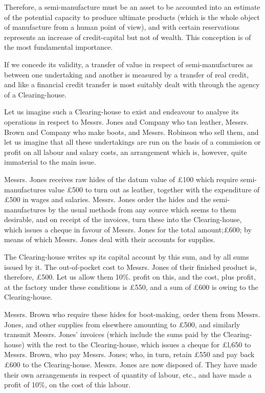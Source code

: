 \documentclass{book}
\begin{document}
Therefore, a semi-manufacture must be an asset to be accounted into an estimate of the potential capacity to produce ultimate products (which is the whole object of manufacture from a human point of view), and with certain reservations represents an increase of credit-capital but not of wealth. This conception is of the most fundamental importance.

If we concede its validity, a transfer of value in respect of semi-manufactures as between one undertaking and another is measured by a transfer of real credit, and like a financial credit transfer is most suitably dealt with through the agency of a Clearing-house.

Let us imagine such a Clearing-house to exist and endeavour to analyse its operations in respect to Messrs. Jones and Company who tan leather, Messrs. Brown and Company who make boots, and Messrs. Robinson who sell them, and let us imagine that all these undertakings are run on the basis of a commission or profit on all labour and salary costs, an arrangement which is, however, quite immaterial to the main issue.

Messrs. Jones receives raw hides of the datum value of £100 which require semi-manufactures value £500 to turn out as leather, together with the expenditure of £500 in wages and salaries. Messrs. Jones order the hides and the semi-manufactures by the usual methods from any source which seems to them desirable, and on receipt of the invoices, turn these into the Clearing-house, which issues a cheque in favour of Messrs. Jones for the total amount;£600; by means of which Messrs. Jones deal with their accounts for supplies.

The Clearing-house writes \emph{up} its capital account by this sum, and by all sums issued by it. The out-of-pocket cost to Messrs. Jones of their finished product is, therefore, £500. Let us allow them 10\%. profit on this, and the cost, plus profit, at the factory under these conditions is £550, and a sum of £600 is owing to the Clearing-house.

Messrs. Brown who require these hides for boot-making, order them from Messrs. Jones, and other supplies from elsewhere amounting to £500, and similarly transmit Messrs. Jones’ invoices (which include the sums paid by the Clearing-house) with the rest to the Clearing-house, which issues a cheque for £l,650 to Messrs. Brown, who pay Messrs. Jones; who, in turn, retain £550 and pay back £600 to the Clearing-house. Messrs. Jones are now disposed of. They have made their own arrangements in respect of quantity of labour, etc., and have made a profit of 10\%, on the cost of this labour.
\end{document}
